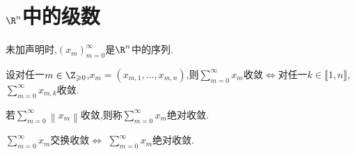 \section{\texorpdfstring{$\R^{n}$}{Rn}中的级数}



未加声明时,$\left(x_{m}\right)_{m=0}^{\infty}$是$\R^{n}$中的序列.

\begin{proposition}{}{}
	设对任一$m\in\Z_{\geqslant 0}$,$x_{m}=\left(x_{m,1},\ldots,x_{m,n}\right)$,则$\sum\limits_{m=0}^{\infty}x_{m}$收敛$\iff$对任一$k\in\llbracket 1,n\rrbracket$,$\sum\limits_{m=0}^{\infty}x_{m,k}$收敛.
\end{proposition}

\begin{definition}{}{}
	若$\sum\limits_{m=0}^{\infty}\left\|x_{m}\right\|$收敛,则称$\sum\limits_{m=0}^{\infty}x_{m}$绝对收敛.
\end{definition}

\begin{proposition}{}{}
	$\sum\limits_{m=0}^{\infty}x_{m}$交换收敛$\iff$ $\sum\limits_{m=0}^{\infty}x_{m}$绝对收敛.
\end{proposition}
